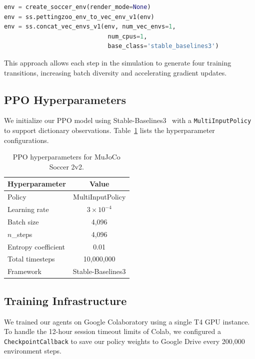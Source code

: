\begin{lstlisting}[language=Python, 
    caption={Environment wrapping for parameter sharing.}, 
    label=list:env_wrapping]
env = create_soccer_env(render_mode=None)
env = ss.pettingzoo_env_to_vec_env_v1(env)
env = ss.concat_vec_envs_v1(env, num_vec_envs=1, 
                             num_cpus=1, 
                             base_class='stable_baselines3')
\end{lstlisting}

This approach allows each step in the simulation to generate four training transitions, increasing batch diversity and accelerating gradient updates.

\subsection{PPO Hyperparameters}

We initialize our PPO model using Stable-Baselines3~\citep{raffin2021stablebaselines3} with a \texttt{MultiInputPolicy} to support dictionary observations. Table~\ref{tab:ppo_hyperparams} lists the hyperparameter configurations.

\begin{table}[!ht]
    \centering
    \caption{PPO hyperparameters for MuJoCo Soccer 2v2.}
    \label{tab:ppo_hyperparams}
    \begin{tabular}{lc}
        \toprule
        \textbf{Hyperparameter} & \textbf{Value} \\
        \midrule
        Policy              & MultiInputPolicy \\
        Learning rate       & $3 \times 10^{-4}$ \\
        Batch size          & 4,096 \\
        $n$\_steps          & 4,096 \\
        Entropy coefficient & 0.01 \\
        Total timesteps     & 10,000,000 \\
        Framework           & Stable-Baselines3 \\
        \bottomrule
    \end{tabular}
\end{table}

\subsection{Training Infrastructure}

We trained our agents on Google Colaboratory using a single T4 GPU instance. To handle the 12-hour session timeout limits of Colab, we configured a \texttt{CheckpointCallback} to save our policy weights to Google Drive every 200,000 environment steps. 

